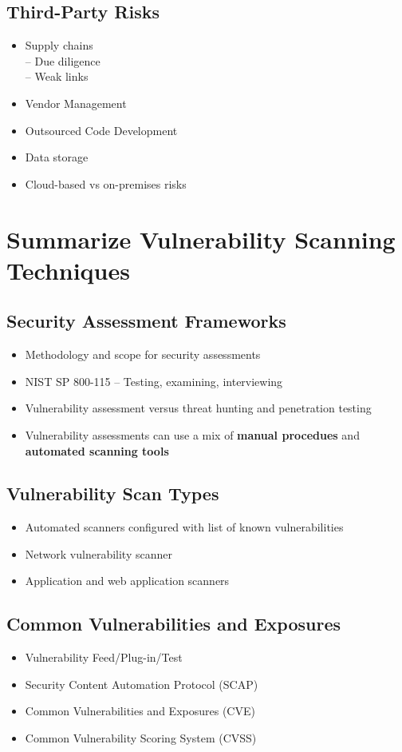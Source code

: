 	\subsection {Third-Party Risks}
		\begin{itemize}
			\item Supply chains \\
				-- Due diligence \\
				-- Weak links
			\item Vendor Management
			\item Outsourced Code Development
			\item Data storage
			\item Cloud-based vs on-premises risks
		\end{itemize}

\section {Summarize Vulnerability Scanning Techniques}
	\subsection {Security Assessment Frameworks}
		\begin{itemize}
			\item Methodology and scope for security assessments
			\item NIST SP 800-115 -- Testing, examining, interviewing
			\item Vulnerability assessment versus threat hunting and penetration testing
			\item Vulnerability assessments can use a mix of \textbf{manual procedues}
				and \textbf{automated scanning tools}
		\end{itemize}
	\subsection {Vulnerability Scan Types}
		\begin{itemize}
			\item Automated scanners configured with list of known vulnerabilities
			\item Network vulnerability scanner
			\item Application and web application scanners
		\end{itemize}
	\subsection {Common Vulnerabilities and Exposures}
		\begin{itemize}
			\item Vulnerability Feed/Plug-in/Test
			\item Security Content Automation Protocol (SCAP)
			\item Common Vulnerabilities and Exposures (CVE)
			\item Common Vulnerability Scoring System (CVSS)
		\end{itemize}
